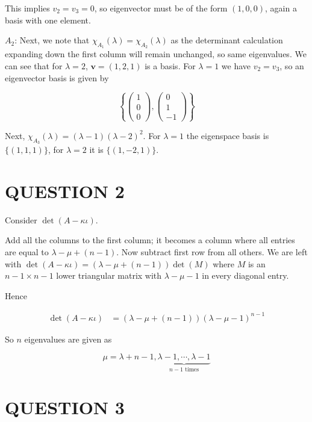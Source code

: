 \documentclass[a4paper]{article}
\begin{document}
This implies $ v_{2} = v_{3} = 0 $, so eigenvector must be of the form $ (1,0,0) $, again a basis with one element.


$ A_{2} $:  Next, we note that $  \chi_{A_{1}}(\lambda) = \chi_{A_{2}}(\lambda)  $ as the determinant calculation expanding down the first column will remain unchanged, so same eigenvalues. We can see that for $ \lambda = 2 $, $ \mathbf{v} = (1,2,1) $ is a basis. For $ \lambda = 1 $ we have $ v_{2} = v_{3}  $, so an eigenvector basis is given by

\[ \left\{ \begin{pmatrix}
1\\
0\\
0
\end{pmatrix}, \begin{pmatrix}
0\\
1\\
-1
\end{pmatrix} \right\} \]

Next, $ \chi_{A_{3}}(\lambda) = (\lambda - 1) (\lambda - 2)^{2} $. For $ \lambda = 1 $ the eigenspace basis is $ \{ (1,1,1) \} $, for $ \lambda = 2 $ it is $ \{  (1,-2,1) \} $.



\section{QUESTION 2}

Consider $ \det(A - \kappa \iota) $.


Add all the columns to the first column; it becomes a column where all entries are equal to $ \lambda - \mu + (n-1) $. Now subtract first row from all others. We are left with $ \det(A - \kappa \iota) = (\lambda - \mu + (n-1)) \det (M) $ where $ M $ is an $ n-1 \times n-1 $ lower triangular matrix with $ \lambda - \mu - 1 $ in every diagonal entry.

Hence 

\begin{align*}
\det(A - \kappa \iota) & =  (\lambda - \mu + (n-1))(\lambda - \mu - 1)^{n-1}  
\end{align*}

So $ n  $ eigenvalues are given as

\[ \mu = \lambda + n-1, \underbrace{\lambda - 1,\cdots,\lambda - 1}_{n-1 \text{ times}}  \]


\section{QUESTION 3}
\end{document}
